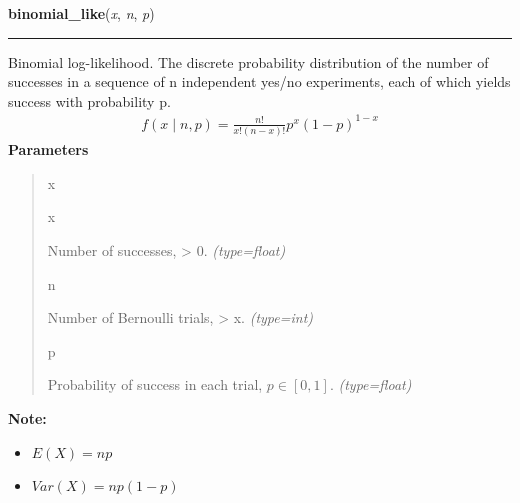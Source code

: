     \vspace{0.5ex}

\hspace{.8\funcindent}\begin{boxedminipage}{\funcwidth}

    \raggedright \textbf{binomial\_like}(\textit{x}, \textit{n}, \textit{p})

    \vspace{-1.5ex}

    \rule{\textwidth}{0.5\fboxrule}
\setlength{\parskip}{2ex}

Binomial log-likelihood.  The discrete probability distribution of the
number of successes in a sequence of n independent yes/no experiments,
each of which yields success with probability p.
\begin{equation*}\begin{split}f(x \mid n, p) = \frac{n!}{x!(n-x)!} p^x (1-p)^{1-x}\end{split}\end{equation*}\setlength{\parskip}{1ex}
      \textbf{Parameters}
      \vspace{-1ex}

      \begin{quote}
        \begin{Ventry}{x}

          \item[x]


Number of successes, {\textgreater} 0.
            {\it (type=float)}

          \item[n]


Number of Bernoulli trials, {\textgreater} x.
            {\it (type=int)}

          \item[p]


Probability of success in each trial, $p \in [0,1]$.
            {\it (type=float)}

        \end{Ventry}

      \end{quote}

\textbf{Note:} \begin{itemize}
\item {} 
$E(X)=np$

\item {} 
$Var(X)=np(1-p)$

\end{itemize}


    \end{boxedminipage}

